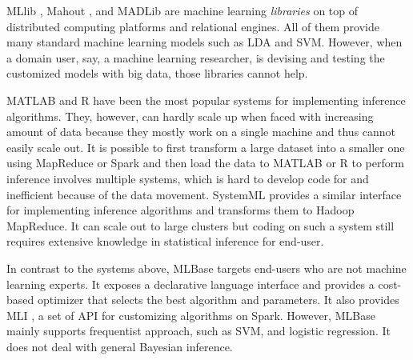 MLlib , Mahout , and MADLib  are machine
learning \emph{libraries} on top of distributed computing platforms and
relational engines. All of them provide many standard machine learning models
such as LDA and SVM.  However, when a domain user, say, a machine learning
researcher, is devising and testing the customized models with big data, those
libraries cannot help.

MATLAB and R have been the most popular systems for implementing inference
algorithms.  They, however, can hardly scale up when faced with increasing
amount of data because they mostly work on a single machine and thus cannot
easily scale out.  It is possible to first transform a large dataset into a
smaller one using MapReduce or Spark and then load the data to MATLAB or R to
perform inference %
involves multiple systems, which is hard to develop code for and inefficient
because of the data movement.  SystemML  provides a similar
interface for implementing inference algorithms and transforms them to Hadoop
MapReduce. It can scale out to large clusters but coding on such a system
still requires extensive knowledge in statistical inference for end-user. 

In contrast to the systems above, MLBase  targets end-users
who are not machine learning experts. It exposes a declarative language
interface and provides a cost-based optimizer that selects the best algorithm
and parameters. It also provides MLI , a set of API for
customizing algorithms on Spark. However, MLBase mainly supports frequentist
approach, such as SVM, and logistic regression. It does not deal with general
Bayesian inference. 

